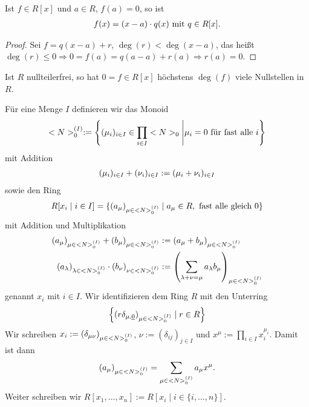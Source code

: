 \begin{conclusion}
	Ist $f \in R[x]$ und $a \in R$, $f(a) = 0$, so ist
	\begin{align}
		f(x) = (x-a)\cdot q(x) \text{ mit } q \in R[x]. \notag
	\end{align}
\end{conclusion}

\begin{proof}
	Sei $f = q(x-a) + r$, $\deg(r) < \deg(x-a)$, das heißt $\deg(r) \leq 0 \Rightarrow 0 = f(a) = q(a-a) + r(a) \Rightarrow r(a) = 0$.
\end{proof}

\begin{conclusion}
	Ist $R$ nullteilerfrei, so hat $0 = f \in R[x]$ höchstens $\deg(f)$ viele Nullstellen in $R$.
\end{conclusion}

\begin{definition}
	Für eine Menge $I$ definieren wir das Monoid
	\begin{align}
	<N>_{0}^{(I)} : = \left\{ (\mu_i)_{i \in I} \in \prod_{i \in I} <N>_{0} \Bigg| \mu_i = 0 \text{ für fast alle } i \right\}\notag
	\end{align}
	mit Addition
	\begin{align}
		(\mu_i)_{i \in I} + (\nu_i)_{i \in I} :=(\mu_i+\nu_i)_{i \in I} \notag
	\end{align}
	sowie den Ring
	\begin{align}
		R[x_i \mid i \in I] = \{ (a_{\mu})_{\mu \in <N>_{0}^{(I)}} \mid a_{\mu} \in R, \text{ fast alle gleich } 0\} \notag
	\end{align}
	mit Addition und Multiplikation
	\begin{align}
		(a_{\mu})_{\mu \in <N>_{0}^{(I)}} + (b_{\mu})_{\mu \in <N>_{0}^{(I)}} &:= (a_{\mu} + b_{\mu})_{\mu \in <N>_{0}^{(I)}}\notag \\
		(a_{\lambda})_{\lambda \in <N>_{0}^{(I)}}\cdot (b_{\nu})_{\nu \in <N>_{0}^{(I)}} &:= \left( \sum_{\lambda + \nu = \mu} a_{\lambda}b_{\mu}\right)_{\mu \in <N>_{0}^{(I)}} \notag
	\end{align}
	genannt  $x_i$ mit $i \in I$. Wir identifizieren dem Ring $R$ mit den Unterring
	\begin{align}
		\left\{ (r\delta_{\mu,\underline{0}})_{\mu \in <N>_{0}^{(I)}}\mid r \in R \right\} \notag
	\end{align}
	Wir schreiben $x_i := (\delta_{\mu\nu})_{\mu \in <N>_{0}^{(I)}}$, $\nu := (\delta_{ij})_{j \in I}$ und $x^{\mu} := \prod_{i \in I}x_i^{\mu_i}$. Damit ist dann
	\begin{align}
		(a_{\mu})_{\mu \in <N>_{0}^{(I)}} = \sum_{\mu \in <N>_{0}^{(I)}} a_{\mu} x^{\mu}. \notag
	\end{align}
	Weiter schreiben wir $R[x_1, \dots, x_n] := R[x_i \mid i \in \{ i, \dots, n \}]$.
\end{definition}

